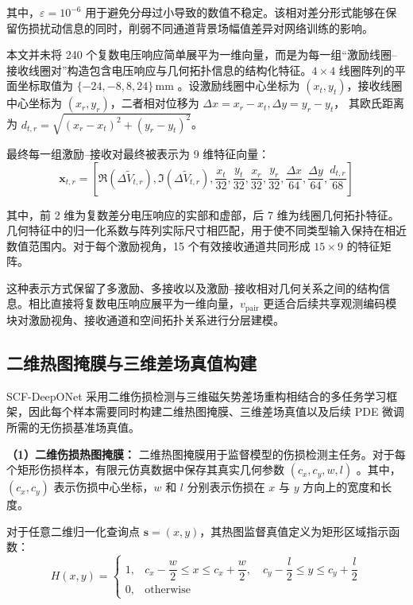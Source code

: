 其中，$\varepsilon=10^{-6}$ 用于避免分母过小导致的数值不稳定。该相对差分形式能够在保留伤损扰动信息的同时，削弱不同通道背景场幅值差异对网络训练的影响。

本文并未将 240 个复数电压响应简单展平为一维向量，而是为每一组``激励线圈--接收线圈对''构造包含电压响应与几何拓扑信息的结构化特征。$4\times4$ 线圈阵列的平面坐标取值为
$
\{-24,-8,8,24\}\,\mathrm{mm}
$
。设激励线圈中心坐标为 $(x_t,y_t)$，接收线圈中心坐标为 $(x_r,y_r)$，二者相对位移为
$
\Delta x=x_r-x_t, \Delta y=y_r-y_t
$，
其欧氏距离为
$
d_{t,r}=\sqrt{(x_r-x_t)^2+(y_r-y_t)^2}
$。

最终每一组激励--接收对最终被表示为 9 维特征向量：
\begin{equation}
\label{eq:v_pair_feature}
\mathbf{x}_{t,r}
=
\left[
\Re(\Delta \widetilde V_{t,r}),
\Im(\Delta \widetilde V_{t,r}),
\frac{x_t}{32},
\frac{y_t}{32},
\frac{x_r}{32},
\frac{y_r}{32},
\frac{\Delta x}{64},
\frac{\Delta y}{64},
\frac{d_{t,r}}{68}
\right]
\end{equation}

其中，前 2 维为复数差分电压响应的实部和虚部，后 7 维为线圈几何拓扑特征。几何特征中的归一化系数与阵列实际尺寸相匹配，用于使不同类型输入保持在相近数值范围内。对于每个激励视角，15 个有效接收通道共同形成 $15\times9$ 的特征矩阵。

这种表示方式保留了多激励、多接收以及激励--接收相对几何关系之间的结构信息。相比直接将复数电压响应展平为一维向量，$v_{\mathrm{pair}}$ 更适合后续共享观测编码模块对激励视角、接收通道和空间拓扑关系进行分层建模。

\subsection{二维热图掩膜与三维差场真值构建}
\label{subsec:label_construction}

SCF-DeepONet 采用二维伤损检测与三维磁矢势差场重构相结合的多任务学习框架，因此每个样本需要同时构建二维热图掩膜、三维差场真值以及后续 PDE 微调所需的无伤损基准场真值。

\textbf{（1）二维伤损热图掩膜：}
二维热图掩膜用于监督模型的伤损检测主任务。对于每个矩形伤损样本，有限元仿真数据中保存其真实几何参数
$
(c_x,c_y,w,l)
$
。其中，$(c_x,c_y)$ 表示伤损中心坐标，$w$ 和 $l$ 分别表示伤损在 $x$ 与 $y$ 方向上的宽度和长度。

对于任意二维归一化查询点 $\mathbf{s}=(x,y)$，其热图监督真值定义为矩形区域指示函数：
\begin{equation}
\label{eq:heat_target_indicator}
H(x,y)
=
\begin{cases}
1, &
c_x-\dfrac{w}{2}\le x\le c_x+\dfrac{w}{2},
\quad
c_y-\dfrac{l}{2}\le y\le c_y+\dfrac{l}{2} \\[6pt]
0, & \mathrm{otherwise}
\end{cases}
\end{equation}

